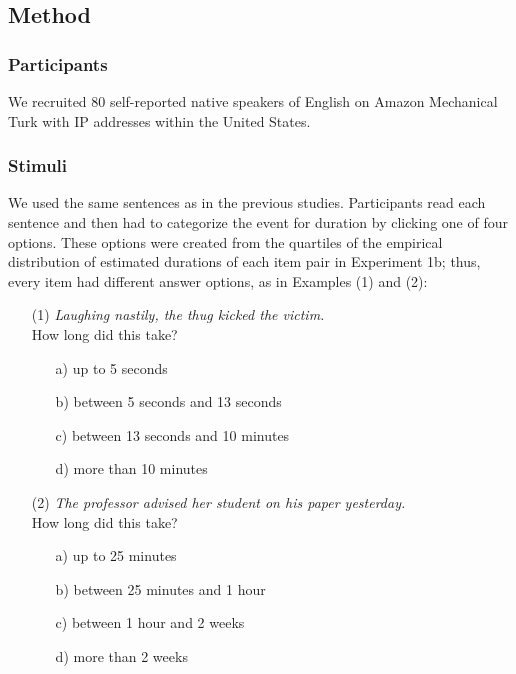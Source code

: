 \documentclass[review,12pt,authoryear]{elsarticle}
\newcommand*{\sectionformat}{\centering}
\begin{document}
\subsection*{\sectionformat Method}\label{sec_methodurative massat}
\subsubsection*{Participants} \label{sec_partCat}

We recruited 80 self-reported native speakers of English on Amazon Mechanical Turk with IP addresses within the United States.

\subsubsection*{Stimuli}\label{sec_stimCat}
We used the same sentences as in the previous studies. Participants read each sentence and then had to categorize the event for duration by clicking one of four options. These options were created from the quartiles of the empirical distribution of estimated durations of each item pair in Experiment 1b; thus, every item had different answer options, as in Examples (1) and (2):

\begin{enumerate}
\item[(1)] \emph{Laughing nastily, the thug kicked the victim. }\\How long did this take?
\begin{itemize}
\item [a)] up to 5 seconds 
\item [b)] between 5 seconds  and 13 seconds
\item [c)] between 13 seconds  and 10 minutes 
\item [d)] more than 10 minutes 
\end{itemize}
\item[(2)] \emph{The professor advised her student on his paper yesterday. }\\How long did this take?
\begin{itemize}
\item [a)] up to 25 minutes
\item [b)] between 25 minutes and 1 hour
\item [c)] between 1 hour and 2 weeks
\item [d)] more than 2 weeks
\end{itemize}
\end{enumerate}
\end{document}

